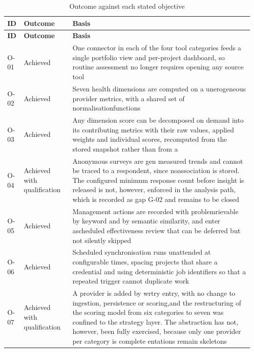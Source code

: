 \begin{longtable}{
  >{\raggedright\arraybackslash}p{}
  >{\raggedright\arraybackslash}p{}
  >{\raggedright\arraybackslash}p{}
}
\caption{Outcome against each stated objective}
\label{tab:objective-outcomes}\\
\toprule
\textbf{ID} & \textbf{Outcome} & \textbf{Basis} \\
\midrule
\endfirsthead
\toprule
\textbf{ID} & \textbf{Outcome} & \textbf{Basis} \\
\midrule
\endhead
\bottomrule
\endlastfoot
O-01 & Achieved & One connector in each of the four tool categories feeds a single portfolio view and per-project dashboard, so routine assessment no
longer requires opening any source tool \\
\addlinespace
O-02 & Achieved & Seven health dimensions are computed on a unerogeneous provider metrics, with a shared set of normalisationfunctions \\
\addlinespace
O-03 & Achieved & Any dimension score can be decomposed on demand into its contributing metrics with their raw values, applied weights and individual
scores, recomputed from the stored snapshot rather than from a \\
\addlinespace
O-04 & Achieved with qualification & Anonymous surveys are gen measured trends and cannot be traced to a respondent, since noassociation is stored. The configured minimum response count before insight is released is not, however, enforced in the analysis path, which is recorded
as gap G-02 and remains to be closed \\
\addlinespace
O-05 & Achieved & Management actions are recorded with problemrievable by keyword and by semantic similarity, and enter ascheduled effectiveness review that can be deferred but not silently skipped \\
\addlinespace
O-06 & Achieved & Scheduled synchronisation runs unattended at configurable times, spacing projects that share a credential and using deterministic job identifiers so that a repeated trigger cannot duplicate work \\
\addlinespace
O-07 & Achieved with qualification & A provider is added by wrtry entry, with no change to ingestion, persistence or scoring,and the restructuring of the scoring model from six categories to seven was confined to the strategy layer. The abstraction has not, however, been fully
exercised, because only one provider per category is complete entations remain skeletons \\
\end{longtable}


